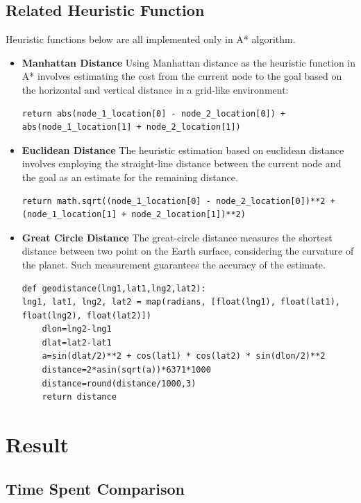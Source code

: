 \documentclass{article}
\begin{document}
	\subsection*{Related Heuristic Function}
	Heuristic functions below are all implemented only in A* algorithm. 
	\begin{itemize}
		\item \textbf{Manhattan Distance}
		Using Manhattan distance as the heuristic function in A* involves estimating the cost from the current node to the goal based on the horizontal and vertical distance in a grid-like environment:
		\begin{verbatim}
return abs(node_1_location[0] - node_2_location[0]) + abs(node_1_location[1] + node_2_location[1])
		\end{verbatim}
		\item \textbf{Euclidean Distance}
		The heuristic estimation based on euclidean distance involves employing the straight-line distance between the current node and the goal as an estimate for the remaining distance.
		 \begin{verbatim}
return math.sqrt((node_1_location[0] - node_2_location[0])**2 + (node_1_location[1] + node_2_location[1])**2)
		 \end{verbatim}
		\item \textbf{Great Circle Distance}
		The great-circle distance measures the shortest distance between two point on the Earth surface, considering the curvature of the planet. Such measurement guarantees the accuracy of the estimate.
		\begin{verbatim}
def geodistance(lng1,lat1,lng2,lat2):
lng1, lat1, lng2, lat2 = map(radians, [float(lng1), float(lat1), float(lng2), float(lat2)])
	dlon=lng2-lng1
	dlat=lat2-lat1
	a=sin(dlat/2)**2 + cos(lat1) * cos(lat2) * sin(dlon/2)**2
	distance=2*asin(sqrt(a))*6371*1000 
	distance=round(distance/1000,3)
	return distance
		\end{verbatim}
	\end{itemize}
	
	\section*{Result}
	\subsection*{Time Spent Comparison}
\end{document}
